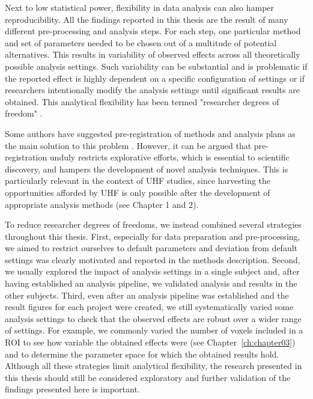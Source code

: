 Next to low statistical power, flexibility in data analysis can also hamper reproducibility. All the findings reported in this thesis are the result of many different pre-processing and analysis steps. For each step, one particular method and set of parameters needed to be chosen out of a multitude of potential alternatives. This results in variability of observed effects across all theoretically possible analysis settings. Such variability can be substantial \parencite{Carp2012} and is problematic if the reported effect is highly dependent on a specific configuration of settings or if researchers intentionally modify the analysis settings until significant results are obtained. This analytical flexibility has been termed "researcher degrees of freedom" \parencite{Simmons2011}.

Some authors have suggested pre-registration of methods and analysis plans as the main solution to this problem \parencite{Poldrack2017a}. However, it can be argued that pre-registration unduly restricts explorative efforts, which is essential to scientific discovery, and hampers the development of novel analysis techniques. This is particularly relevant in the context of UHF studies, since harvesting the opportunities afforded by UHF is only possible after the development of appropriate analysis methods (see Chapter 1 and 2).

To reduce researcher degrees of freedoms, we instead combined several strategies throughout this thesis. First, especially for data preparation and pre-processing, we aimed to restrict ourselves to default parameters and deviation from default settings was clearly motivated and reported in the methods description. Second, we usually explored the impact of analysis settings in a single subject and, after having established an analysis pipeline, we validated analysis and results in the other subjects. Third, even after an analysis pipeline was established and the result figures for each project were created, we still systematically varied some analysis settings to check that the observed effects are robust over a wider range of settings. For example, we commonly varied the number of voxels included in a ROI to see how variable the obtained effects were (see Chapter~\ref{ch:chapter03}) and to determine the parameter space for which the obtained results hold. Although all these strategies limit analytical flexibility, the research presented in this thesis should still be considered exploratory and further validation of the findings presented here is important.

